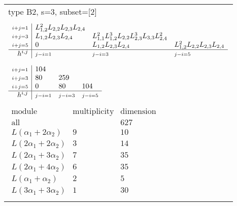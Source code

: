 \documentclass[crop,border=2mm]{standalone}
\begin{document}
\begin{tabular}{l}
{\huge type B2, s=3, subset=[2]}\\ \\


$\displaystyle
\begin{array}{r|l l l}
	{\scriptstyle i+j=1}&L_{1,2}^{2}L_{2,2}L_{2,3}L_{2,4}&&\\
	{\scriptstyle i+j=3}&L_{1,2}L_{2,3}L_{2,4}&L_{1,1}^{2}L_{1,2}^{3}L_{2,2}L_{2,3}^{3}L_{3,3}L_{2,4}^{2}&\\
	{\scriptstyle i+j=5}&0&L_{1,2}L_{2,3}L_{2,4}&L_{1,2}^{2}L_{2,2}L_{2,3}L_{2,4}\\
	\hline h^{i,j}&{\scriptstyle j-i=1}&{\scriptstyle j-i=3}&{\scriptstyle j-i=5}
\end{array}
$ \\ \\


$\displaystyle
\begin{array}{r|l l l}
	{\scriptstyle i+j=1}&104&&\\
	{\scriptstyle i+j=3}&80&259&\\
	{\scriptstyle i+j=5}&0&80&104\\
	\hline h^{i,j}&{\scriptstyle j-i=1}&{\scriptstyle j-i=3}&{\scriptstyle j-i=5}
\end{array}
$ \\ \\


$\displaystyle
\begin{array}{rll}
	\text{module}&\text{multiplicity}&\text{dimension} \\ \hline \text{all}&&627 \\
	L\left(\alpha_{1}+ 2\alpha_{2}\right)&9&10\\
	L\left( 2\alpha_{1}+ 2\alpha_{2}\right)&3&14\\
	L\left( 2\alpha_{1}+ 3\alpha_{2}\right)&7&35\\
	L\left( 2\alpha_{1}+ 4\alpha_{2}\right)&6&35\\
	L\left(\alpha_{1}+\alpha_{2}\right)&2&5\\
	L\left( 3\alpha_{1}+ 3\alpha_{2}\right)&1&30
\end{array}
$ \\ \\

\end{tabular}
\end{document}

